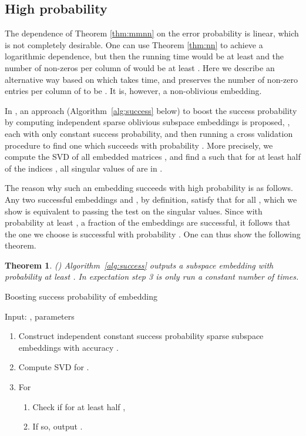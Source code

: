 \documentclass[11pt]{article}
\newtheorem{theorem}{Theorem}
\begin{document}
\subsection{High probability}\label{sec:whp}
The dependence of Theorem \ref{thm:mmnn} on the error probability  is linear, which is not completely
desirable. One can use Theorem \ref{thm:nn} to achieve a logarithmic dependence, but then the running time
would be at least  and the number of non-zeros per column of  would
be at least . Here we describe an alternative way based on \cite{BKLW14} 
which takes 
time, and preserves the number of non-zero entries per column of  to be . It is, however, a
non-oblivious embedding. 

In \cite{BKLW14}, an approach (Algorithm~\ref{alg:success} below) to boost the success probability 
by computing 
independent sparse oblivious subspace embeddings  is proposed, , 
each with only constant success probability,
and then running a cross validation procedure to find one which succeeds with probability .
More precisely, we compute the SVD of all embedded matrices ,
and find a  such that for at least half of the indices ,
all singular values of  are in .

The reason why such an embedding  succeeds with high probability is as follows.
Any two successful embeddings  and , by definition, satisfy that
 for all ,
which we show is equivalent to passing the test on the singular values.
Since with probability at least , a  fraction of the embeddings are successful,
it follows that the one we choose is successful with probability . One can thus show
the following theorem.

\begin{theorem}\label{thm:success}(\cite{BKLW14})
Algorithm~\ref{alg:success} outputs a subspace embedding with probability at least .
In expectation step 3 is only run a constant number of times.
\end{theorem}

\begin{algorithm}[t]
\caption{Boosting success probability of embedding}
\label{alg:success}
Input: , parameters 
\begin{enumerate}
\item Construct  independent constant success probability sparse subspace embeddings 
with accuracy .
\item Compute SVD  for .
\item For 
\begin{enumerate}
\item Check if for at least half , 
\item If so, output .
\end{enumerate}
\end{enumerate}
\end{algorithm}
\end{document}

